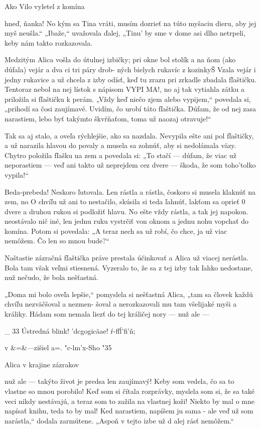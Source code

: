 \documentclass[12pt]{article}
\begin{document}
\begin{Parallel}[p]{}{}
{{Ako Vilo vyletel z komína

hneď, ňanka! No kým sa Tina vráti, musím dozrieť na túto
myšaciu dieru, aby jej myš neušla.“ „Ibaže,“ uvažovala
ďalej, „Tinu' by sme v dome asi dlho netrpeli, keby nám
takto rozkazovala.

Medzitým Alica vošla do útulnej izbičky; pri okne bol
stolík a na ňom (ako dúfala) vejár a dva ci tri páry drob-
ných bielych rukavíc z kozinkyŠ Vzala vejár i jedny rukavice
a už chcela z izby odísť, keď tu zrazu pri zrkadle zbadala
fľaštičku. Tentoraz nebol na nej lístok s nápisom VYPI MA!,
no aj tak vytiahla zátku a priložila si fľaštičku k perám.
„Vždy keď niečo zjem alebo vypijem,“ povedala si, „prihodí
sa čosi zaujímavé. Uvidím, čo urobí táto fľaštička. Dúfam,
že od nej zasa narastiem, lebo byť takýmto škvŕňaťom,
toma už naozaj otravuje!“

Tak sa aj stalo, a oveľa rýchlejšie, ako sa nazdala.
Nevypila ešte ani pol fľaštičky, a už narazila hlavou do
povaly a musela sa zohnúť, aby si nedolámala väzy. Chytro
položila fľašku na zem a povedala si: „To stačí — dúfam, že
viac už neporastiem — veď ani takto už neprejdem cez
dvere — škoda, že som toho'tolko vypila!“

Beda-prebeda! Neskoro ľutovala. Len rástla a rástla,
čoskoro si musela klaknúť na zem, no O chvíľu už ani to
nestačilo, skúsila si teda ľahnúť, lakťom sa oprieť 0 dvere
a druhou rukou si podložiť hlavu. No ešte vždy rástla, a tak
jej napokon. neostávalo nič iné, len jednu ruku vystrčiť von
oknom a jednu nohu vopchať do komína. Potom si
povedala: „A teraz nech sa už robí, čo chce, ja už viac
nemôžem. Čo len so mnou bude?“

Naštastie zázračná fľaštička práve prestala účinkovať
a Alica už viacej nerástla. Bola tam však veľmi stiesnená.
Vyzeralo to, že sa z tej izby tak ľahko nedostane, nuž
nečudo, že bola nešťastná.

„Doma mi bolo oveľa lepšie,“ pomyslela si nešťastná
Alica, „tam sa človek každú chvíľu nezväčšoval a nezmen-
šoval a nerozkazovali mu tam všelijaké myši a králiky.
Hádam som nemala liezť do tej králičej nory — nuž ale —

_ 33
Ústredná blink!
'dcgogicäae! ŕ-ffĺ'fi'ň;

v &=&—zišiel a=.
"c-lm'x-Sho "35

 

Alica v krajine zázrakov

nuž ale — takýto život je predsa len zaujímavý! Keby
som vedela, čo sa to vlastne so mnou porobilo! Keď som si
čítala rozprávky, myslela som si, že sa také veci nikdy
nestávajú, a teraz som to zažila na vlastnej koži! Niekto by
mal o mne napísať knihu, teda to by mal! Ked narastiem,
napíšem ju sama - ale veď už som narástla,“ dodala
zarmútene. „Aspoň v tejto izbe už d alej rásť nemôžem.“

}}
\end{Parallel}
\end{document}
